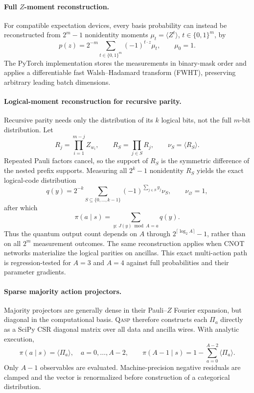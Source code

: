 \documentclass[10pt]{article}
\newcommand{\qasp}{\textsc{Qasp}}
\begin{document}
\paragraph{Full $Z$-moment reconstruction.}
For compatible expectation devices, every basis probability can instead be
reconstructed from $2^m-1$ nonidentity moments
$\mu_t=\langle Z^t\rangle$, $t\in\{0,1\}^m$, by
\begin{equation}
  p(z)=2^{-m}\sum_{t\in\{0,1\}^{m}}(-1)^{t\cdot z}\mu_t,
  \qquad \mu_0=1.
  \label{eq:fwht}
\end{equation}
The PyTorch implementation stores the measurements in binary-mask order and
applies a differentiable fast Walsh--Hadamard transform (FWHT), preserving
arbitrary leading batch dimensions.

\paragraph{Logical-moment reconstruction for recursive parity.}
Recursive parity needs only the distribution of its $k$ logical bits, not the
full $m$-bit distribution.  Let
\begin{equation}
  R_j=\prod_{i=1}^{m-j}Z_{w_i},
  \qquad
  R_S=\prod_{j\in S}R_j,
  \qquad
  \nu_S=\langle R_S\rangle.
  \label{eq:logical-parity-observables}
\end{equation}
Repeated Pauli factors cancel, so the support of $R_S$ is the symmetric
difference of the nested prefix supports.  Measuring all
$2^k-1$ nonidentity $R_S$ yields the exact logical-code distribution
\begin{equation}
  q(y)=2^{-k}\sum_{S\subseteq\{0,\ldots,k-1\}}
       (-1)^{\sum_{j\in S}y_j}\nu_S,
  \qquad \nu_{\varnothing}=1,
  \label{eq:logical-fwht}
\end{equation}
after which
\begin{equation}
  \pi(a\mid s)=\sum_{y:\,J(y)\bmod A=a}q(y).
  \label{eq:logical-modulo}
\end{equation}
Thus the quantum output count depends on $A$ through
$2^{\lceil\log_2A\rceil}-1$, rather than on all $2^m$ measurement outcomes.
The same reconstruction applies when CNOT networks materialize the logical
parities on ancillas.  This exact multi-action path is regression-tested for
$A=3$ and $A=4$ against full probabilities and their parameter gradients.

\paragraph{Sparse majority action projectors.}
Majority projectors are generally dense in their Pauli--$Z$ Fourier expansion,
but diagonal in the computational basis.  \qasp{} therefore constructs each
$\Pi_a$ directly as a SciPy CSR diagonal matrix over all data and ancilla
wires.  With analytic execution,
\begin{equation}
  \pi(a\mid s)=\langle\Pi_a\rangle,
  \quad a=0,\ldots,A-2,
  \qquad
  \pi(A-1\mid s)=1-\sum_{a=0}^{A-2}\langle\Pi_a\rangle.
  \label{eq:sparse-residual}
\end{equation}
Only $A-1$ observables are evaluated.  Machine-precision negative residuals
are clamped and the vector is renormalized before construction of a
categorical distribution.
\end{document}
